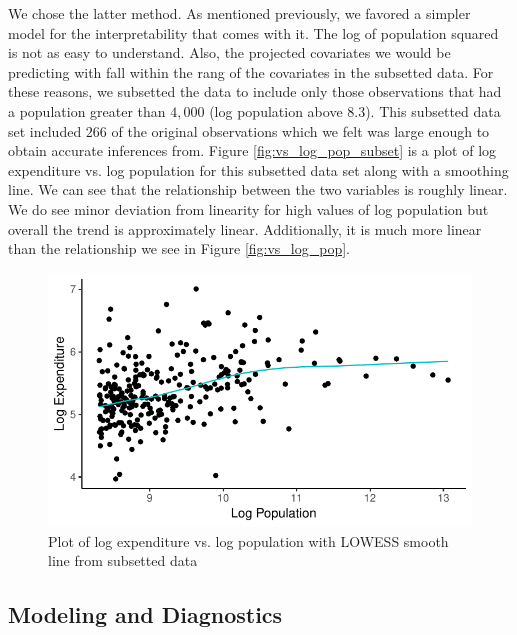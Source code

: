 \documentclass{article}\usepackage[]{graphicx}\usepackage[]{color}
\makeatletter
\def\maxwidth{ %
  \ifdim\Gin@nat@width>\linewidth
    \linewidth
  \else
    \Gin@nat@width
  \fi
}
\newenvironment{knitrout}{}{} %
\makeatother
\begin{document}
We chose the latter method. As mentioned previously, we favored a simpler model for the interpretability that comes with it. The log of population squared is not as easy to understand. Also, the projected covariates we would be predicting with fall within the rang of the covariates in the subsetted data. For these reasons, we subsetted the data to include only those observations that had a population greater than $4,000$ (log population above $8.3$). This subsetted data set included $266$ of the original observations which we felt was large enough to obtain accurate inferences from. Figure \ref{fig:vs_log_pop_subset} is a plot of log expenditure vs. log population for this subsetted data set along with a smoothing line. We can see that the relationship between the two variables is roughly linear. We do see minor deviation from linearity for high values of log population but overall the trend is approximately linear. Additionally, it is much more linear than the relationship we see in Figure \ref{fig:vs_log_pop}.

\begin{knitrout}
\color{fgcolor}\begin{figure}[h]
\includegraphics[width=\maxwidth]{figure/r_fig_vs_log_pop_subset-1} \caption{\label{fig:vs_log_pop_subset} Plot of log expenditure vs. log population with LOWESS smooth line from subsetted data}\label{fig:r fig_vs_log_pop_subset}
\end{figure}


\end{knitrout}

\subsection{Modeling and Diagnostics} \label{modeling}
\end{document}
